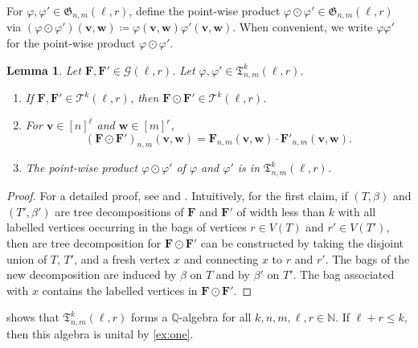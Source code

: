 \documentclass[10pt,a4paper]{article}
\theoremstyle{definition}
\theoremstyle{plain}
\newtheorem{lemma}[definition]{Lemma}
\theoremstyle{remark}
\renewcommand{\phi}{\varphi}
\begin{document}
	For $\phi, \phi' \in \mathfrak{G}_{n,m}(\ell, r)$, define  the point-wise product $\phi \odot \phi' \in \mathfrak{G}_{n,m}(\ell, r)$ via $(\phi \odot \phi')(\boldsymbol{v}, \boldsymbol{w}) \coloneqq \phi(\boldsymbol{v}, \boldsymbol{w}) \phi'(\boldsymbol{v}, \boldsymbol{w})$.
	When convenient, we write $\phi \phi'$ for the point-wise product $\phi \odot \phi'$.

	\begin{lemma}\label{lem:gluing}
		Let $\boldsymbol{F}, \boldsymbol{F}' \in \mathcal{G}(\ell, r)$.
		Let $\phi, \phi' \in \mathfrak{T}^k_{n,m}(\ell, r)$.
		\begin{enumerate}
			\item If $\boldsymbol{F}, \boldsymbol{F}' \in \mathcal{T}^k(\ell, r)$,
			then $\boldsymbol{F} \odot \boldsymbol{F}' \in \mathcal{T}^k(\ell, r)$.
			\item For $\boldsymbol{v} \in [n]^\ell$ and $\boldsymbol{w} \in [m]^r$,  			\[
				(\boldsymbol{F} \odot \boldsymbol{F}')_{n,m}(\boldsymbol{v}, \boldsymbol{w})  = \boldsymbol{F}_{n,m}(\boldsymbol{v}, \boldsymbol{w}) \cdot \boldsymbol{F}'_{n,m}(\boldsymbol{v}, \boldsymbol{w}).
			\]
			\item The point-wise product $\phi \odot \phi'$ of $\phi$ and $\phi'$ is in $\mathfrak{T}^k_{n,m}(\ell, r)$.
		\end{enumerate}
	\end{lemma}
	\begin{proof}
		For a detailed proof, see \cite[Lemma 6.13]{grohe_homomorphism_2025} and \cite[Lemma 3.2.13]{seppelt_homomorphism_2024}.
		Intuitively, for the first claim, if $(T, \beta)$ and $(T', \beta')$ are tree decompositions of $\boldsymbol{F}$ and $\boldsymbol{F}'$ of width less than $k$ with all labelled vertices occurring in the bags of vertices $r \in V(T)$ and $r' \in V(T')$, 
		then are tree decomposition for $\boldsymbol{F} \odot \boldsymbol{F}'$ can be constructed by taking the disjoint union of $T$, $T'$, and a fresh vertex $x$ and connecting $x$ to $r$ and $r'$.
		The bags of the new decomposition are induced by $\beta$ on $T$ and by $\beta'$ on $T'$.
		The bag associated with $x$ contains the labelled vertices in $\boldsymbol{F} \odot \boldsymbol{F}'$.
	\end{proof}

	 shows that $\mathfrak{T}^k_{n,m}(\ell,r)$ forms a $\mathbb{Q}$-algebra for all $k,n,m, \ell, r \in \mathbb{N}$.
	If $\ell +r \leq k$, then this algebra is unital by \cref{ex:one}.
		
	 
\end{document}
